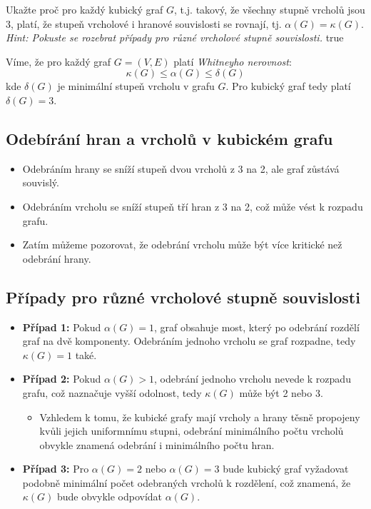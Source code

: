 \documentclass[10pt, a4paper]{ReportSheet}
\begin{document}
    \begin{uloha}{10}{2}{
        Ukažte proč pro každý kubický graf $G$, t.j. takový, že všechny stupně vrcholů jsou 3, platí, že stupeň vrcholové i hranové souvislosti se rovnají, tj. $\alpha(G) = \kappa(G)$.
        \textit{Hint: Pokuste se rozebrat případy pro různé vrcholové stupně souvislosti.}
    }{true}

        Víme, že pro každý graf $G=(V, E)$ platí \textit{Whitneyho nerovnost}:
        \begin{equation*}
            \kappa(G) \leq \alpha(G) \leq \delta(G)
        \end{equation*}
        kde $\delta(G)$ je minimální stupeň vrcholu v grafu $G$. Pro kubický graf tedy platí $\delta(G) = 3$.

        \subsection{Odebírání hran a vrcholů v kubickém grafu}
        \begin{itemize}
            \item Odebráním hrany se sníží stupeň dvou vrcholů z 3 na 2, ale graf zůstává souvislý.
            \item Odebráním vrcholu se sníží stupeň tří hran z 3 na 2, což může vést k rozpadu grafu.
            \item Zatím můžeme pozorovat, že odebrání vrcholu může být více kritické než odebrání hrany.
        \end{itemize}

        \subsection{Případy pro různé vrcholové stupně souvislosti}
        \begin{itemize}
            \item \textbf{Případ 1:} Pokud $\alpha(G) = 1$, graf obsahuje most, který po odebrání rozdělí graf na dvě
            komponenty. Odebráním jednoho vrcholu se graf rozpadne, tedy $\kappa(G) = 1$ také.
            \item \textbf{Případ 2:} Pokud $\alpha(G) > 1$, odebrání jednoho vrcholu nevede k rozpadu grafu, což naznačuje vyšší odolnost, tedy $\kappa(G)$ může být 2 nebo 3.
            \begin{itemize}
                \item Vzhledem k tomu, že kubické grafy mají vrcholy a hrany těsně propojeny kvůli jejich uniformnímu stupni, odebrání minimálního počtu vrcholů obvykle znamená odebrání i minimálního počtu hran.
            \end{itemize}
            \item \textbf{Případ 3:} Pro $\alpha(G) = 2$ nebo $\alpha(G) = 3$ bude kubický graf vyžadovat podobně minimální počet odebraných vrcholů k rozdělení, což znamená, že $\kappa(G)$ bude obvykle odpovídat $\alpha(G)$.
        \end{itemize}


\end{uloha}
\end{document}
